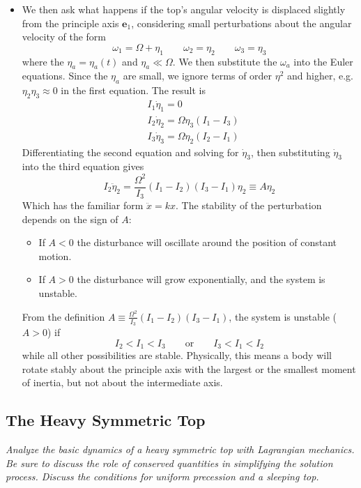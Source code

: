 \documentclass[11pt, a4paper]{article}
\newcommand{\eqtext}[1]{\qquad \text{#1} \qquad}
\newcommand{\e}{\bm{e}} %
\begin{document}
\begin{itemize}
	\item We then ask what happens if the top's angular velocity is displaced slightly from the principle axis $ \e_{1} $, considering small perturbations about the angular velocity of the form
	\begin{equation*}
		\omega_{1} = \Omega + \eta_{1} \qquad \omega_{2} = \eta_{2} \qquad \omega_{3} = \eta_{3}
	\end{equation*}
	where the $ \eta_{a} = \eta_{a}(t) $ and $ \eta_{a} \ll \Omega $. We then substitute the $ \omega_{a} $ into the Euler equations. Since the $ \eta_{a} $ are small, we ignore terms of order $ \eta^{2} $ and higher, e.g. $ \eta_{2}\eta_{3} \approx 0 $ in the first equation. The result is
	\begin{align*}
		&I_{1}\dot{\eta}_{1} = 0\\
		&I_{2}\dot{\eta}_{2} = \Omega \eta_{3}(I_{1} - I_{3})\\
		&I_{3}\dot{\eta}_{3} = \Omega \eta_{2}(I_{2} - I_{1})
	\end{align*}
	Differentiating the second equation and solving for $ \dot{\eta}_{3} $, then substituting $ \dot{\eta}_{3} $ into the third equation gives
	\begin{equation*}
		I_{2} \ddot{\eta}_{2} = \frac{\Omega^{2}}{I_{3}} (I_{1} - I_{2})(I_{3} - I_{1}) \eta_{2} \equiv A \eta_{2}
	\end{equation*}
	Which has the familiar form $ \ddot{x} = k x $. The stability of the perturbation depends on the sign of $ A $:
	\begin{itemize}
		\item If $ A < 0 $ the disturbance will oscillate around the position of constant motion.
		\item If $ A > 0 $ the disturbance will grow exponentially, and the system is unstable.
	\end{itemize}
	From the definition $ A \equiv \frac{\Omega^{2}}{I_{3}} (I_{1} - I_{2})(I_{3} - I_{1})  $, the system is unstable ($ A > 0 $) if 
	\begin{equation*}
		I_{2} < I_{1} < I_{3} \eqtext{or} I_{3} < I_{1} < I_{2}
	\end{equation*}
	while all other possibilities are stable. Physically, this means a body will rotate stably about the principle axis with the largest or the smallest moment of inertia, but not about the intermediate axis.
	
\end{itemize}

\subsection{The Heavy Symmetric Top}
\textit{Analyze the basic dynamics of a heavy symmetric top with Lagrangian mechanics. Be sure to discuss the role of conserved quantities in simplifying the solution process. Discuss the conditions for uniform precession and a sleeping top.}
\vspace{2mm}
\end{document}
